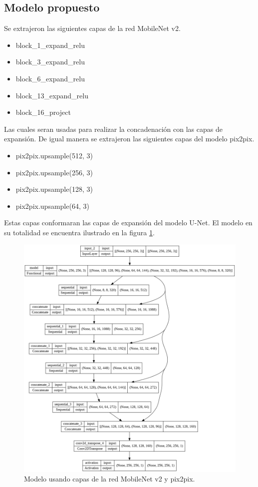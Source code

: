 \subsection{Modelo propuesto}

Se extrajeron las siguientes capas de la red MobileNet v2.

\begin{itemize}
    \item block\_1\_expand\_relu
    \item block\_3\_expand\_relu
    \item block\_6\_expand\_relu
    \item block\_13\_expand\_relu
    \item block\_16\_project
\end{itemize}

Las cuales seran usadas para realizar la concadenación con las capas de expansión. De igual manera se extrajeron las siguientes capas del modelo pix2pix.

\begin{itemize}
    \item  pix2pix.upsample(512, 3)
    \item pix2pix.upsample(256, 3)
    \item pix2pix.upsample(128, 3)
    \item pix2pix.upsample(64, 3)
\end{itemize}

Estas capas conformaran las capas de expansión del modelo U-Net. El modelo en su totalidad se encuentra ilustrado en la figura \ref{fig:model}.

\begin{figure}[H]
    \centering
    \includegraphics[width=12cm]{Graphics/model.png}
    \caption{Modelo usando capas de la red MobileNet v2 y pix2pix.}
    \label{fig:model}
\end{figure}

